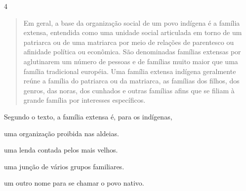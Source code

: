 \num{4}

\begin{quote}
Em geral, a base da organização social de um povo indígena é a
família extensa, entendida como uma unidade social articulada em torno
de um patriarca ou de uma matriarca por meio de relações de parentesco
ou afinidade política ou econômica. São denominadas famílias extensas
por aglutinarem um número de pessoas e de famílias muito maior que uma
família tradicional européia. Uma família extensa indígena geralmente
reúne a família do patriarca ou da matriarca, as famílias dos filhos,
dos genros, das noras, dos cunhados e outras famílias afins que se
filiam à grande família por interesses específicos.

\end{quote}

Segundo o texto, a família extensa é, para os indígenas,

\begin{escolha}
\item uma organização proibida nas aldeias.

\item uma lenda contada pelos mais velhos.

\item uma junção de vários grupos familiares.

\item um outro nome para se chamar o povo nativo.
\end{escolha}


